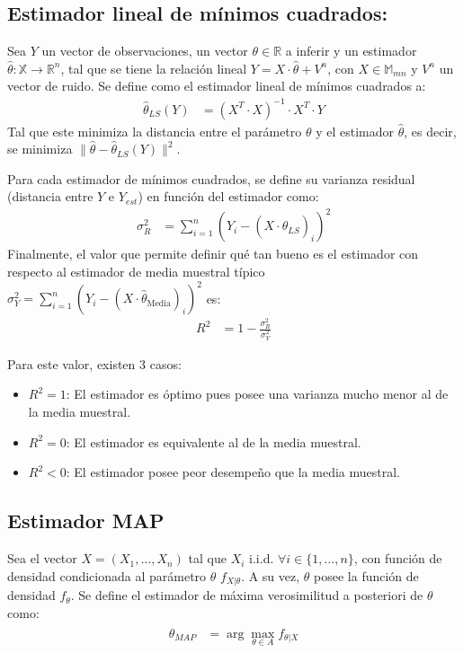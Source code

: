 \documentclass[
  11pt,
  letterpaper,
   addpoints,
  ]{exam}
\begin{document}
\subsection*{Estimador lineal de mínimos cuadrados:}

Sea $Y$ un vector de observaciones, un vector $\theta \in \mathbb{R}$ a inferir y un estimador $\hat{\theta} : \mathbb{X} \to \mathbb{R}^n$, tal que se tiene la relación lineal $Y = X \cdot \hat{\theta} + V^n$, con $X \in \mathbb{M}_{mn}$ y $V^n$ un vector de ruido. Se define como el estimador lineal de mínimos cuadrados a:
\begin{align}
\hat{\theta}_{LS}(Y) &= (X^T \cdot X)^{-1} \cdot X^T \cdot Y
\end{align}
Tal que este minimiza la distancia entre el parámetro $\theta$ y el estimador $\hat{\theta}$, es decir, se minimiza $\|\hat{\theta} - \hat{\theta}_{LS}(Y)\|^2$.

Para cada estimador de mínimos cuadrados, se define su varianza residual (distancia entre $Y$ e $Y_{est}$) en función del estimador como:
\begin{align}
\sigma_R^2 &= \sum_{i=1}^n (Y_i - (X \cdot \hat{\theta}_{LS})_i)^2
\end{align}
Finalmente, el valor que permite definir qué tan bueno es el estimador con respecto al estimador de media muestral típico $\sigma_Y^2 = \sum_{i=1}^n (Y_i - (X \cdot \hat{\theta}_{\text{Media}})_i)^2$ es:
\begin{align}
R^2 &= 1 - \frac{\sigma_R^2}{\sigma_Y^2}
\end{align}

Para este valor, existen 3 casos:
\begin{itemize}
    \item $R^2 = 1$: El estimador es óptimo pues posee una varianza mucho menor al de la media muestral.
    \item $R^2 = 0$: El estimador es equivalente al de la media muestral.
    \item $R^2 < 0$: El estimador posee peor desempeño que la media muestral.
\end{itemize}

\subsection*{Estimador MAP}

Sea el vector $X = (X_1, \dots, X_n)$ tal que $X_i$ i.i.d. $\forall i \in \{1, \dots, n\}$, con función de densidad condicionada al parámetro $\theta$ $f_{X|\theta}$. A su vez, $\theta$ posee la función de densidad $f_\theta$. Se define el estimador de máxima verosimilitud a posteriori de $\theta$ como:
\begin{align}
\hat{\theta}_{MAP} &= \arg \max_{\theta \in A} f_{\theta|X}
\end{align}
\end{document}
